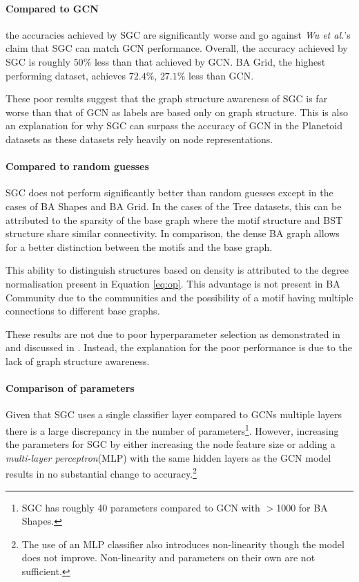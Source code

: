 \paragraph{Compared to GCN}
the accuracies achieved by SGC are significantly worse and go against \textit{Wu et al.}'s claim that SGC can match GCN performance.
Overall, the accuracy achieved by SGC is roughly $50\%$ less than that achieved by GCN.
BA Grid, the highest performing dataset, achieves $72.4\%$, $27.1\%$ less than GCN.

These poor results suggest that the graph structure awareness of SGC is far worse than that of GCN as labels are based only on graph structure.
This is also an explanation for why SGC can surpass the accuracy of GCN in the Planetoid~\cite{kipf2016semi} datasets as these datasets rely heavily on node representations.

\paragraph{Compared to random guesses}
SGC does not perform significantly better than random guesses except in the cases of BA Shapes and BA Grid.
In the cases of the Tree datasets, this can be attributed to the sparsity of the base graph where the motif structure and BST structure share similar connectivity.
In comparison, the dense BA graph allows for a better distinction between the motifs and the base graph.

This ability to distinguish structures based on density is attributed to the degree normalisation present in Equation \ref{eq:op}.
This advantage is not present in BA Community due to the communities and the possibility of a motif having multiple connections to different base graphs.

These results are not due to poor hyperparameter selection as demonstrated in  and discussed in .
Instead, the explanation for the poor performance is due to the lack of graph structure awareness.

\paragraph{Comparison of parameters}
Given that SGC uses a single classifier layer compared to GCNs multiple layers there is a large discrepancy in the number of parameters\footnote{SGC has roughly 40 parameters compared to GCN with $>$1000 for BA Shapes.}.
However, increasing the parameters for SGC by either increasing the node feature size or adding a \emph{multi-layer perceptron}(MLP) with the same hidden layers as the GCN model results in no substantial change to accuracy.\footnote{The use of an MLP classifier also introduces non-linearity though the model does not improve. Non-linearity and parameters on their own are not sufficient.}

